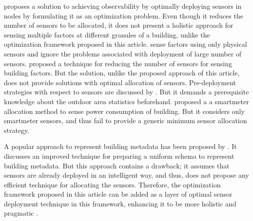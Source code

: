 \documentclass[]{interact}
\theoremstyle{plain}%
\theoremstyle{definition}
\theoremstyle{remark}
\begin{document}
\cite{chang} proposes a solution to  achieving observability by optimally deploying sensors in nodes by formulating it as an optimization problem.
Even though it reduces the number of sensors to be allocated, it does not present a holistic approach for sensing multiple factors at different granules of a building, unlike the optimization framework proposed in this article.
\cite{bellala_electrons, meyn} sense factors using only physical sensors and ignore the problems associated with deployment of large  number of sensors. 
\cite{anshuleEnergy16} proposed a technique for reducing the number of sensors for sensing building factors.
But the solution, unlike the proposed approach of this article, does not provide solutions with optimal allocation of sensors.
Pre-deployment strategies with respect to sensors are discussed by \cite{max_info_min_comm}.
But it demands a prerequisite knowledge about the outdoor area statistics beforehand. 
\cite{smartmeter} proposed a a smartmeter allocation method to sense power consumption of building.
But it considers only smartmeter sensors,  and thus fail to provide a generic minimum sensor allocation strategy.

A popular approach to represent building metadata has been proposed by \cite{brick}.
It discusses an improved technique for preparing a uniform schema to represent building metadata. %
But this approach contains a drawback; it assumes that sensors are already deployed in an intelligent way, and thus, does not propose any efficient technique for allocating the sensors. %
Therefore, the optimization framework proposed in this article can be added as a layer of optimal sensor deployment technique in this framework, enhancing it to be more holistic and pragmatic .%
\end{document}
